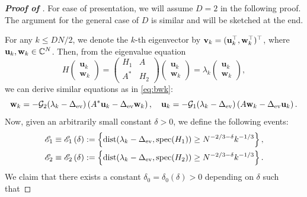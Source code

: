 \documentclass[10pt,reqno]{amsart}
\numberwithin{equation}{section}
\numberwithin{figure}{section}
\theoremstyle{plain} %
\theoremstyle{definition} %
\newcommand{\cal}{\mathcal}
\renewcommand{\txt}[1]{\text{\rm{#1}}}
\newcommand{\C}{\mathbb{C}}
\newcommand{\cG}{{\mathcal G}}
\newcommand{\pa}[1]{\left({#1}\right)}
\newcommand{\dist}{\mathrm{dist}}
\newcommand{\spec}{\mathrm{spec}}
\newcommand{\bu}{{\bf{u}}}
\newcommand{\bv}{{\bf{v}}}
\newcommand{\bw}{{\bf{w}}}
\newcommand{\be}{\begin{equation}}
\newcommand{\ee}{\end{equation}}
\numberwithin{equation}{section}
\begin{document}
\begin{proof}[\bf Proof of ]
For ease of presentation, we will assume $D=2$ in the following proof. The argument for the general case of $D$ is similar and will be sketched at the end.

For any $k\le DN/2$, we denote the $k$-th eigenvector by $\bv_k=(\bu_k^\top, \bw_k^\top)^\top$, where $\bu_k,\bw_k\in \C^N$. 
Then, from the eigenvalue equation
\[
H \begin{pmatrix}
\mathbf{u}_k \\
\mathbf{w}_k
\end{pmatrix}=\begin{pmatrix}
H_1 & A \\
A^* & H_2
\end{pmatrix}
\begin{pmatrix}
\mathbf{u}_k \\
\mathbf{w}_k
\end{pmatrix}
=
\lambda_k
\begin{pmatrix}
\mathbf{u}_k \\
\mathbf{w}_k
\end{pmatrix},
\]
we can derive similar equations as in \eqref{eq:bwk}:   
\be\label{eq:bwbu}\bw_k = -\cG_2(\lambda_k-\Delta_{\txt{ev}})  \pa{A^*\bu_k-\Delta_{\txt{ev}}\bw_k}, \quad \bu_k=-{\cal G}_1(\lambda_k-\Delta_{\txt{ev}}) \left( A\bw_k-\Delta_{\txt{ev}} \bu_k \right).\ee
Now, given an arbitrarily small constant $\delta>0$, we define the following events:
\begin{equation}\nonumber
    \begin{aligned}
        &\mathscr E_1\equiv \mathscr E_1\pa{\delta}:=\left\{\dist(\lambda_k-\Delta_{\txt{ev}}, \spec(H_1))\ge N^{-2/3-\delta}k^{-1/3}\right\},\\
        &\mathscr E_2\equiv \mathscr E_2 \pa{\delta}:=\left\{\dist(\lambda_k-\Delta_{\txt{ev}}, \spec(H_2))\ge N^{-2/3-\delta}k^{-1/3}\right\}.
    \end{aligned}
\end{equation}
We claim that there exists a constant $\delta_0=\delta_0\pa{\delta}>0$ depending on $\delta$ such that 

\end{proof}
\end{document}
